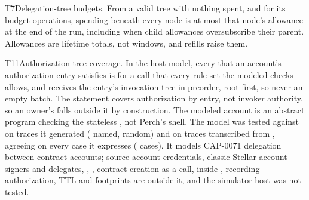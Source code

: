 \begin{perchstatement}{T7}{Delegation-tree budgets.}\label{stmt:delegation-tree-budgets}
From a valid tree with nothing spent, and for its budget operations, spending beneath every node is at most that node's allowance at the end of the run, including when child allowances oversubscribe their parent. Allowances are lifetime totals, not windows, and refills raise them.
\end{perchstatement}
\begin{perchstatement}{T11}{Authorization-tree coverage.}\label{stmt:authorization-tree-coverage}
In the host model, every  that an account's authorization entry satisfies is for a call that every rule set the modeled  checks allows, and  receives the entry's invocation tree in preorder, root first, so never an empty batch. The statement covers authorization by entry, not invoker authority, so an owner's  falls outside it by construction. The modeled account is an abstract program checking the stateless , not Perch's shell. The model was tested against  on  traces it generated ( named,  random) and on  traces transcribed from , agreeing on every case it expresses ( cases). It models CAP-0071 delegation between contract accounts; source-account credentials, classic Stellar-account signers and delegates, , , contract creation as a call,  inside , recording authorization, TTL and footprints are outside it, and the simulator host  was not tested.
\end{perchstatement}
